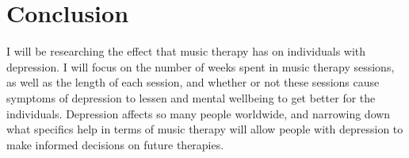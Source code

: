 \documentclass[12pt]{article}
\begin{document}
 \section{Conclusion}
 \label{sec:con}
 
 I will be researching the effect that music therapy has on individuals with depression. I will focus on the number of weeks spent in music therapy sessions, as well as the length of each session, and whether or not these sessions cause symptoms of depression to lessen and mental wellbeing to get better for the individuals. Depression affects so many people worldwide, and narrowing down what specifics help in terms of music therapy will allow people with depression to make informed decisions on future therapies.

 
 
\end{document}
